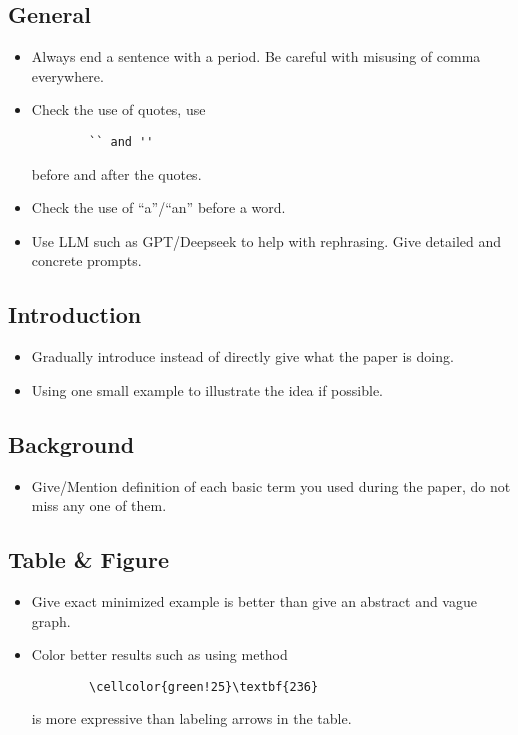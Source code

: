 \documentclass[acmsmall,screen,review]{acmart}
\begin{document}
\subsection{General}
\begin{itemize}
    \item Always end a sentence with a period. Be careful with misusing of comma everywhere.
    \item Check the use of quotes, use
    \begin{verbatim}
        `` and ''
    \end{verbatim}
    \vspace{-\baselineskip}
    before and after the quotes.
    \item Check the use of ``a''/``an'' before a word.
    \item Use LLM such as GPT/Deepseek to help with rephrasing. Give detailed and concrete prompts.
\end{itemize}

\subsection{Introduction}
\begin{itemize}
    \item Gradually introduce instead of directly give what the paper is doing.
    \item Using one small example to illustrate the idea if possible.
\end{itemize}

\subsection{Background}
\begin{itemize}
    \item Give/Mention definition of each basic term you used during the paper, do not miss any one of them.
\end{itemize}

\subsection{Table \& Figure}
\begin{itemize}
    \item Give exact minimized example is better than give an abstract and vague graph.
    \item Color better results such as using method
    \begin{verbatim}
        \cellcolor{green!25}\textbf{236}
    \end{verbatim}
    \vspace{-\baselineskip}
    is more expressive than labeling arrows in the table.
\end{itemize}
\end{document}
